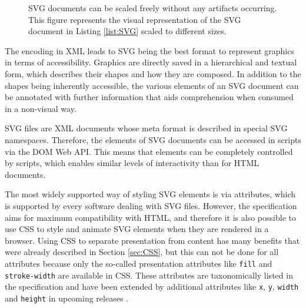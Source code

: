 \begin{figure}[tp]
\centering
{}
\caption[SVG Scaling]{
  SVG documents can be scaled freely without any artifacts occurring. 
  This figure represents the visual representation of the SVG document in Listing \ref{list:SVG} scaled to different sizes. 
}
\label{fig:SVG}
\end{figure}

The encoding in XML leads to SVG being the best format to represent graphics in terms of accessibility. Graphics are directly saved in a hierarchical and textual form, which describes their shapes and how they are composed. In addition to the shapes being inherently accessible, the various elements of an SVG document can be annotated with further information that aids comprehension when consumed in a non-visual way.

SVG files are XML documents whose meta format is described in special SVG namespaces. Therefore, the elements of SVG documents can be accessed in scripts via the DOM Web API. This means that elements can be completely controlled by scripts, which enables similar levels of interactivity than for HTML documents.

The most widely supported way of styling SVG elements is via attributes, which is supported by every software dealing with SVG files. However, the specification aims for maximum compatibility with HTML, and therefore it is also possible to use CSS to style and animate SVG elements when they are rendered in a browser. Using CSS to separate presentation from content has many benefits that were already described in Section \ref{sec:CSS}, but this can not be done for all attributes because only the so-called presentation attributes like \lstinline{fill} and \lstinline{stroke-width} are available in CSS. These attributes are taxonomically listed in the specification \parencite{CSS1.1} and have been extended by additional attributes like \lstinline{x}, \lstinline{y}, \lstinline{width} and \lstinline{height} in upcoming releases \parencite{CSS2}.

